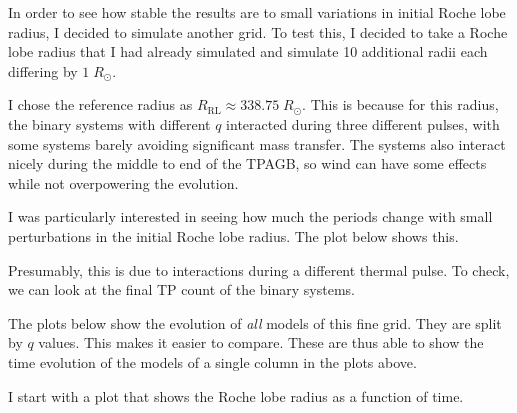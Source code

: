 \documentclass[a4paper,10pt]{article}
\begin{document}

In order to see how stable the results are to small variations in initial Roche lobe radius, I decided to simulate another grid. To test this, I decided to take a Roche lobe radius that I had already simulated and simulate 10 additional radii each differing by \(1\;R_\odot \). 

I chose the reference radius as \(R_\text{RL} \approx 338.75\;R_\odot \). This is because for this radius, the binary systems with different \(q\) interacted during three different pulses, with some systems barely avoiding significant mass transfer. The systems also interact nicely during the middle to end of the TPAGB, so wind can have some effects while not overpowering the evolution.

I was particularly interested in seeing how much the periods change with small perturbations in the initial Roche lobe radius. The plot below shows this.
\begin{figure}[ht]
    \centering
\end{figure}

Presumably, this is due to interactions during a different thermal pulse. To check, we can look at the final TP count of the binary systems.

\begin{figure}[ht]
    \centering
\end{figure}

The plots below show the evolution of \emph{all} models of this fine grid. They are split by \(q\) values. This makes it easier to compare. These are thus able to show the time evolution of the models of a single column in the plots above.

I start with a plot that shows the Roche lobe radius as a function of time.

\begin{figure}[ht]
    \centering
\end{figure}
\end{document}
